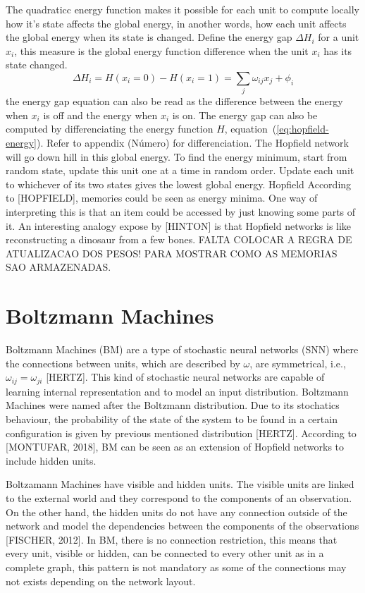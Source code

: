 The quadraticc energy function makes it possible for each unit to compute locally how it's state affects the global energy, in another words, how each unit affects the global energy when its state is changed. Define the energy gap $\Delta H_{i}$ for a unit $x_{i}$, this measure is the global energy function difference when the unit $x_{i}$ has its state changed.
\begin{equation}\label{eq:hopfield-energy-gap}
  \Delta H_{i} = H(x_{i} = 0) - H(x_{i} = 1) = \sum_{j} \omega_{ij} x_{j} + \phi_{i}
\end{equation}
the energy gap equation can also be read as the difference between the energy when $x_{i}$ is off and the energy when $x_{i}$ is on. The energy gap can also be computed by differenciating the energy function $H$, equation~(\ref{eq:hopfield-energy}). Refer to appendix (N\'{u}mero) for differenciation.
The Hopfield network will go down hill in this global energy. To find the energy minimum, start from random state, update this unit one at a time in random order. Update each unit to whichever of its two states gives the lowest global energy.
Hopfield
According to [HOPFIELD], memories could be seen as energy minima. One way of interpreting this is that an item could be accessed by just knowing some parts of it. An interesting analogy expose by [HINTON] is that Hopfield networks is like reconstructing a dinosaur from a few bones. FALTA COLOCAR A REGRA DE ATUALIZACAO DOS PESOS! PARA MOSTRAR COMO AS MEMORIAS SAO ARMAZENADAS.




 

\section{Boltzmann Machines}

Boltzmann Machines (BM) are a type of stochastic neural networks (SNN) where the connections between units, which are described by $\omega$, are symmetrical, i.e., $\omega_{ij} = \omega_{ji}$ [HERTZ].
This kind of stochastic neural networks are capable of learning internal representation and to model an input distribution.
Boltzmann Machines were named after the Boltzmann distribution.
Due to its stochatics behaviour, the probability of the state of the system to be found in a certain configuration is given by previous mentioned distribution [HERTZ].
According to [MONTUFAR, 2018], BM can be seen as an extension of Hopfield networks to include hidden units.

Boltzamann Machines have visible and hidden units.
The visible units are linked to the external world and they correspond to the components of an observation. On the other hand, the hidden units do not have any connection outside of the network and model the dependencies between the components of the observations [FISCHER, 2012].
In BM, there is no connection restriction, this means that every unit, visible or hidden, can be connected to every other unit as in a complete graph, this pattern is not mandatory as some of the connections may not exists depending on the network layout.


